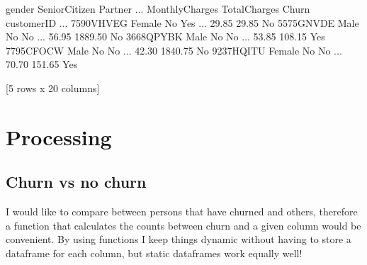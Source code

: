 \documentclass[letterpaper,10pt,english]{jupyterBook}
\begin{document}
\begin{sphinxVerbatim}[commandchars=\\\{\}]
            gender SeniorCitizen Partner  ... MonthlyCharges  TotalCharges Churn
customerID                                ...                                   
7590\PYGZhy{}VHVEG  Female            No     Yes  ...          29.85         29.85    No
5575\PYGZhy{}GNVDE    Male            No      No  ...          56.95       1889.50    No
3668\PYGZhy{}QPYBK    Male            No      No  ...          53.85        108.15   Yes
7795\PYGZhy{}CFOCW    Male            No      No  ...          42.30       1840.75    No
9237\PYGZhy{}HQITU  Female            No      No  ...          70.70        151.65   Yes

[5 rows x 20 columns]
\end{sphinxVerbatim}


\section{Processing}
\label{\detokenize{c7_case_studies/Churn:processing}}

\subsection{Churn vs no churn}
\label{\detokenize{c7_case_studies/Churn:churn-vs-no-churn}}
\sphinxAtStartPar
I would like to compare between persons that have churned and others, therefore a function that calculates the counts between churn and a given column would be convenient.
By using functions I keep things dynamic without having to store a dataframe for each column, but static dataframes work equally well!

\begin{sphinxVerbatim}[commandchars=\\\{\}]
 
   \PYG{p}{[} \PYG{p}{]}
\end{sphinxVerbatim}

\begin{sphinxVerbatim}[commandchars=\\\{\}]
\end{sphinxVerbatim}
\end{document}
